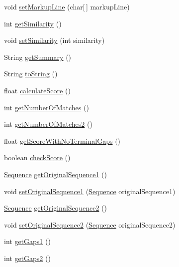 \begin{DoxyCompactItemize}
\item 
void \hyperlink{classjaligner_1_1_alignment_a8447b039c854e628939693a1559c2c9e}{set\+Markup\+Line} (char\mbox{[}$\,$\mbox{]} markup\+Line)
\item 
int \hyperlink{classjaligner_1_1_alignment_ac7ffc2c5cc00467b766e2a9447420aaa}{get\+Similarity} ()
\item 
void \hyperlink{classjaligner_1_1_alignment_a5237fd2e649ffb1e19b85576e7a303c2}{set\+Similarity} (int similarity)
\item 
String \hyperlink{classjaligner_1_1_alignment_a3d250e0dcf2923a86b99818754e81e98}{get\+Summary} ()
\item 
String \hyperlink{classjaligner_1_1_alignment_a3ebf1293daf2ec02fe754d07a31e6a7f}{to\+String} ()
\item 
float \hyperlink{classjaligner_1_1_alignment_a412518ac97945f4efeacaffb0a2db896}{calculate\+Score} ()
\item 
int \hyperlink{classjaligner_1_1_alignment_aeb4d1e3f60d8ce729e23cba0351a6c0f}{get\+Number\+Of\+Matches} ()
\item 
int \hyperlink{classjaligner_1_1_alignment_a32636c678af76a2d435562d684679b92}{get\+Number\+Of\+Matches2} ()
\item 
float \hyperlink{classjaligner_1_1_alignment_a43a82c42d3220541cbc9c9eb53d49f8e}{get\+Score\+With\+No\+Terminal\+Gaps} ()
\item 
boolean \hyperlink{classjaligner_1_1_alignment_ab9ec4af0857b026b6a61ef95c5d62aad}{check\+Score} ()
\item 
\hyperlink{classjaligner_1_1_sequence}{Sequence} \hyperlink{classjaligner_1_1_alignment_a0c12e63557ffe3811418054b100744bf}{get\+Original\+Sequence1} ()
\item 
void \hyperlink{classjaligner_1_1_alignment_ad41b3db8eee6829da988657b7588c2c7}{set\+Original\+Sequence1} (\hyperlink{classjaligner_1_1_sequence}{Sequence} original\+Sequence1)
\item 
\hyperlink{classjaligner_1_1_sequence}{Sequence} \hyperlink{classjaligner_1_1_alignment_acfe767713eefb64f61d62632347ca04a}{get\+Original\+Sequence2} ()
\item 
void \hyperlink{classjaligner_1_1_alignment_a4c2c8b94faaf757a90bdbcb1611d20a4}{set\+Original\+Sequence2} (\hyperlink{classjaligner_1_1_sequence}{Sequence} original\+Sequence2)
\item 
int \hyperlink{classjaligner_1_1_alignment_aab382d680bfff5de44fc45f8b8b4a532}{get\+Gaps1} ()
\item 
int \hyperlink{classjaligner_1_1_alignment_afaed289aea427146978a44e4f9256d9c}{get\+Gaps2} ()
\end{DoxyCompactItemize}
